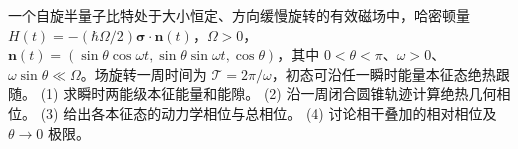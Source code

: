一个自旋半量子比特处于大小恒定、方向缓慢旋转的有效磁场中，哈密顿量 \(H(t)=-(\hbar\Omega/2)\boldsymbol\sigma\cdot\boldsymbol n(t)\)，\(\Omega>0\)，\(\boldsymbol n(t)=(\sin\theta\cos\omega t,\sin\theta\sin\omega t,\cos\theta)\)，其中 \(0<\theta<\pi\)、\(\omega>0\)、\(\omega\sin\theta\ll\Omega\)。场旋转一周时间为 \(\mathcal T=2\pi/\omega\)，初态可沿任一瞬时能量本征态绝热跟随。
(1) 求瞬时两能级本征能量和能隙。
(2) 沿一周闭合圆锥轨迹计算绝热几何相位。
(3) 给出各本征态的动力学相位与总相位。
(4) 讨论相干叠加的相对相位及 \(\theta\to0\) 极限。
